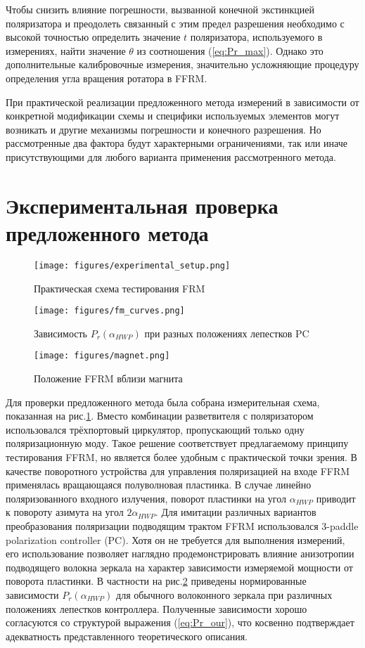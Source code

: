 \documentclass{article}
\begin{document}
Чтобы снизить влияние погрешности, вызванной конечной экстинкцией поляризатора и преодолеть связанный с этим предел разрешения необходимо с высокой точностью определить значение $t$ поляризатора, используемого в измерениях, найти значение $\theta$ из соотношения (\ref{eq:Pr_max}).
Однако это дополнительные калибровочные измерения, значительно усложняющие процедуру определения угла вращения ротатора в FFRM.

При практической реализации предложенного метода измерений в зависимости от конкретной модификации схемы и специфики используемых элементов могут возникать и другие механизмы погрешности и конечного разрешения.
Но рассмотренные два фактора будут характерными ограничениями, так или иначе присутствующими для любого варианта применения рассмотренного метода.   


\section{Экспериментальная проверка предложенного метода}
\begin{figure}[b]
	\centering
	\texttt{[image: figures/experimental\_setup.png]}
	\caption{Практическая схема тестирования FRM}
	\label{fig:experimantalScheme}
\end{figure}

\begin{figure}[b]
	\centering
	\texttt{[image: figures/fm\_curves.png]}
	\caption{Зависимость $P_r(\alpha_{HWP})$ при разных положениях лепестков PC}
	\label{fig:fm_curves}
\end{figure}

\begin{figure}[b]
	\centering
	\texttt{[image: figures/magnet.png]}
	\caption{Положение FFRM вблизи магнита}
	\label{fig:magnet}
\end{figure}

Для проверки предложенного метода была собрана измерительная схема, показанная на рис.\ref{fig:experimantalScheme}.
Вместо комбинации разветвителя с поляризатором использовался трёхпортовый циркулятор, пропускающий только одну поляризационную моду.
Такое решение соответствует предлагаемому принципу тестирования FFRM, но является более удобным с практической точки зрения.
В качестве поворотного устройства для управления поляризацией на входе FFRM применялась вращающаяся полуволновая пластинка.
В случае линейно поляризованного входного излучения, поворот пластинки на угол $\alpha_{HWP}$ приводит к повороту азимута на угол $2\alpha_{HWP}$. 
Для имитации различных вариантов преобразования поляризации подводящим трактом FFRM использовался  3-paddle polarization controller (PC).
Хотя он не требуется для выполнения измерений, его использование позволяет наглядно продемонстрировать влияние анизотропии подводящего волокна зеркала на характер зависимости измеряемой мощности от поворота пластинки.
В частности на рис.\ref{fig:fm_curves} приведены нормированные зависимости $P_r(\alpha_{HWP})$ для обычного волоконного зеркала при различных положениях лепестков контроллера.
Полученные зависимости хорошо согласуются со структурой выражения (\ref{eq:Pr_our}), что косвенно подтверждает адекватность представленного теоретического описания.
\end{document}
